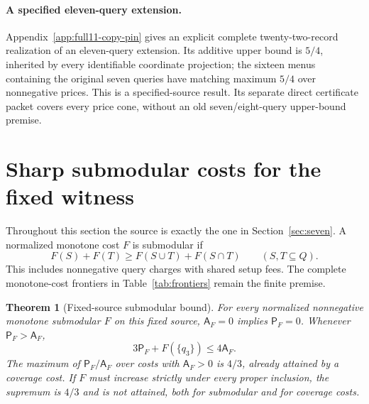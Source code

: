 \documentclass[pdflatex,sn-mathphys-num]{sn-jnl}
\newcommand{\A}{\mathsf{A}}
\newcommand{\Pcost}{\mathsf{P}}
\theoremstyle{thmstyleone}
\newtheorem{theorem}{Theorem}
\theoremstyle{thmstylethree}
\theoremstyle{thmstyletwo}
\begin{document}
\paragraph*{A specified eleven-query extension.}
Appendix~\ref{app:full11-copy-pin} gives an explicit complete
twenty-two-record realization of an eleven-query extension.
Its additive upper bound is $5/4$, inherited by every identifiable coordinate
projection; the sixteen menus containing the original seven queries have
matching maximum $5/4$ over nonnegative prices. This is a specified-source
result. Its separate direct certificate packet covers every price cone,
without an old seven/eight-query upper-bound premise.

\section{Sharp submodular costs for the fixed witness}\label{sec:submodular}
Throughout this section the source is exactly the one in Section~\ref{sec:seven}. A normalized monotone cost $F$ is submodular if
\[
 F(S)+F(T)\geq F(S\cup T)+F(S\cap T)\qquad(S,T\subseteq Q).
\]
This includes nonnegative query charges with shared setup fees. The complete monotone-cost frontiers in Table~\ref{tab:frontiers} remain the finite premise.

\begin{theorem}[Fixed-source submodular bound]\label{thm:submodular}
For every normalized nonnegative monotone submodular $F$ on this fixed source, $\A_F=0$ implies $\Pcost_F=0$. Whenever $\Pcost_F>\A_F$,
\begin{equation}\label{eq:strengthened}
 3\Pcost_F+F(\{q_3\})\leq4\A_F.
\end{equation}
The maximum of $\Pcost_F/\A_F$ over costs with $\A_F>0$ is $4/3$, already attained by a coverage cost. If $F$ must increase strictly under every proper inclusion, the supremum is $4/3$ and is not attained, both for submodular and for coverage costs.
\end{theorem}
\end{document}
